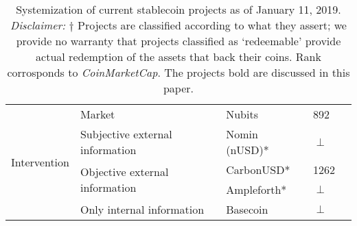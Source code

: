 \begin{table}[t]
\begin{tabular}{|l|l|l|l|l|}
                                                                                                                 
\multirow{5}{*}{Intervention}                                                           
						& \multirow{1}{*}{Market} 										& Nubits & 892 \\ \cline{2-4}
						& \multirow{1}{*}{Subjective external information}  		& Nomin (nUSD)* & $\perp$  \\ \cline{2-4}
						& \multirow{2}{*}{Objective external information}  		& CarbonUSD* & 1262 \\ \cline{3-4}
						&														& Ampleforth* & $\perp$ \\ \cline{2-4}
						& \multirow{1}{*}{Only internal information} 			& Basecoin & $\perp$ \\ \hline

\end{tabular}
\caption{Systemization of current stablecoin projects as of January 11, 2019. \textit{Disclaimer:} $\dagger$ Projects are classified according to what they assert; \eg we provide no warranty that projects classified as `redeemable' provide actual redemption of the assets that back their coins. Rank corrosponds to \textit{CoinMarketCap}. The projects bold are discussed in this paper.\label{tab:stablecoins}}
\end{table}
